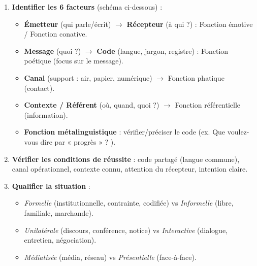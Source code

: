 \documentclass[11pt]{article}
\newcommand{\cle}[1]{{\popxbold\color{popdark}#1}}
\begin{document}
\begin{methode}
\begin{enumerate}
\item \textbf{Identifier les 6 facteurs} (schéma ci-dessous) :
\begin{itemize}
\item \textbf{Émetteur} (qui parle/écrit) $\rightarrow$ \textbf{Récepteur} (à qui ?) : \cle{Fonction émotive} / \cle{Fonction conative}.
\item \textbf{Message} (quoi ?) $\rightarrow$ \textbf{Code} (langue, jargon, registre) : \cle{Fonction poétique} (focus sur le message).
\item \textbf{Canal} (support : air, papier, numérique) $\rightarrow$ \cle{Fonction phatique} (contact).
\item \textbf{Contexte / Référent} (où, quand, quoi ?) $\rightarrow$ \cle{Fonction référentielle} (information).
\item \textbf{Fonction métalinguistique} : vérifier/préciser le code (ex. \og Que voulez-vous dire par « progrès » ? \fg{}).
\end{itemize}
\item \textbf{Vérifier les conditions de réussite} : code partagé (langue commune), canal opérationnel, contexte connu, attention du récepteur, intention claire.
\item \textbf{Qualifier la situation} :
\begin{itemize}
\item \emph{Formelle} (institutionnelle, contrainte, codifiée) vs \emph{Informelle} (libre, familiale, marchande).
\item \emph{Unilatérale} (discours, conférence, notice) vs \emph{Interactive} (dialogue, entretien, négociation).
\item \emph{Médiatisée} (média, réseau) vs \emph{Présentielle} (face-à-face).
\end{itemize}
\end{enumerate}
\end{methode}
\end{document}
